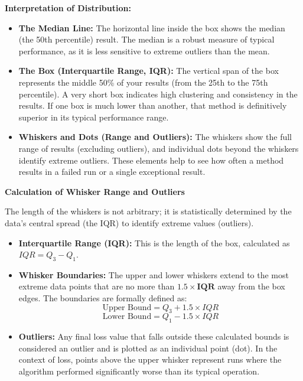 \noindent \textbf{Interpretation of Distribution:}
\begin{itemize}
    \item \textbf{The Median Line:} The horizontal line inside the box shows the median (the 50th percentile) result. The median is a robust measure of typical performance, as it is less sensitive to extreme outliers than the mean.
    \item \textbf{The Box (Interquartile Range, IQR):} The vertical span of the box represents the middle 50\% of your results (from the 25th to the 75th percentile). A very short box indicates high clustering and consistency in the results. If one box is much lower than another, that method is definitively superior in its typical performance range.
    \item \textbf{Whiskers and Dots (Range and Outliers):} The whiskers show the full range of results (excluding outliers), and individual dots beyond the whiskers identify extreme outliers. These elements help to see how often a method results in a failed run or a single exceptional result.
\end{itemize}



\noindent \textbf{Calculation of Whisker Range and Outliers}

\noindent The length of the whiskers is not arbitrary; it is statistically determined by the data's central spread (the IQR) to identify extreme values (outliers).

\begin{itemize}
    \item \textbf{Interquartile Range (IQR):} This is the length of the box, calculated as $IQR = Q_3 - Q_1$.
    \item \textbf{Whisker Boundaries:} The upper and lower whiskers extend to the most extreme data points that are no more than $\mathbf{1.5 \times IQR}$ away from the box edges. The boundaries are formally defined as:
    $$
    \text{Upper Bound} = Q_3 + 1.5 \times IQR
    $$
    $$
    \text{Lower Bound} = Q_1 - 1.5 \times IQR
    $$
    \item \textbf{Outliers:} Any final loss value that falls outside these calculated bounds is considered an outlier and is plotted as an individual point (dot). In the context of loss, points above the upper whisker represent runs where the algorithm performed significantly worse than its typical operation.
\end{itemize}

